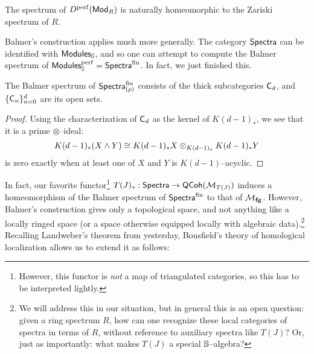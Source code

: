 \begin{theorem}[Balmer]
The spectrum of $D^{\perf}(\CatOf{Mod}_R)$ is naturally homeomorphic to the Zariski spectrum of $R$.
\end{theorem}

Balmer's construction applies much more generally.  The category $\CatOf{Spectra}$ can be identified with $\CatOf{Modules}_{\S}$, and so one can attempt to compute the Balmer spectrum of $\CatOf{Modules}_{\S}^{\perf} = \CatOf{Spectra}^{\mathrm{fin}}$.  In fact, we just finished this.
\begin{theorem}
The Balmer spectrum of $\CatOf{Spectra}_{(p)}^{\mathrm{fin}}$ consists of the thick subcategories $\CatOf C_d$, and $\{\CatOf C_n\}_{n=0}^d$ are its open sets.
\end{theorem}
\begin{proof}
Using the characterization of $\CatOf C_d$ as the kernel of $K(d-1)_*$, we see that it is a prime $\otimes$--ideal: \[K(d-1)_*(X \sm Y) \cong K(d-1)_* X \otimes_{K(d-1)_*} K(d-1)_* Y\] is zero exactly when at least one of $X$ and $Y$ is $K(d-1)$--acyclic.
\end{proof}

In fact, our favorite functor\footnote{However, this functor is \emph{not} a map of triangulated categories, so this has to be interpreted lightly.} $T(J)_*: \CatOf{Spectra} \to \CatOf{QCoh}(\M_{T(J)})$ induces a homeomorphism of the Balmer spectrum of $\CatOf{Spectra}^{\mathrm{fin}}$ to that of $\moduli{fg}$.  However, Balmer's construction gives only a topological space, and not anything like a locally ringed space (or a space otherwise equipped locally with algebraic data).\footnote{We will address this in our situation, but in general this is an open question: given a ring spectrum $R$, how can one recognize these local categories of spectra in terms of $R$, without reference to auxiliary spectra like $T(J)$?  Or, just as importantly: what makes $T(J)$ a special $\S$--algebra?}  Recalling Landweber's theorem from yesterday, Bousfield's theory of homological localization allows us to extend it as follows:

